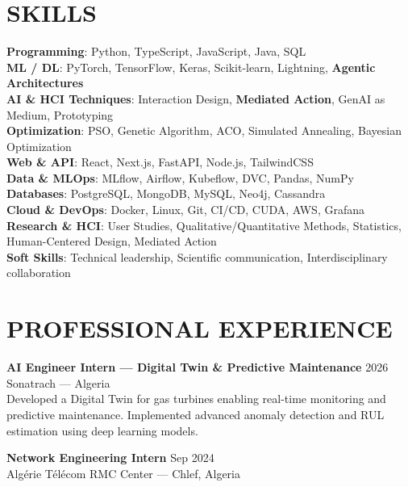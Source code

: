\documentclass[a4paper,12pt]{article}
\begin{document}
\section{SKILLS}
\setlength{\parskip}{-1pt}
{\normalsize
\textbf{Programming}: Python, TypeScript, JavaScript, Java, SQL \\

\textbf{ML / DL}: PyTorch, TensorFlow, Keras, Scikit-learn, Lightning, \textbf{Agentic Architectures} \\

\textbf{AI \& HCI Techniques}: Interaction Design, \textbf{Mediated Action}, GenAI as Medium, Prototyping \\

\textbf{Optimization}: PSO, Genetic Algorithm, ACO, Simulated Annealing, Bayesian Optimization \\

\textbf{Web \& API}: React, Next.js, FastAPI, Node.js, TailwindCSS \\

\textbf{Data \& MLOps}: MLflow, Airflow, Kubeflow, DVC, Pandas, NumPy \\

\textbf{Databases}: PostgreSQL, MongoDB, MySQL, Neo4j, Cassandra \\

\textbf{Cloud \& DevOps}: Docker, Linux, Git, CI/CD, CUDA, AWS, Grafana \\

\textbf{Research \& HCI}: User Studies, Qualitative/Quantitative Methods, Statistics, Human-Centered Design, Mediated Action \\

\textbf{Soft Skills}: Technical leadership, Scientific communication, Interdisciplinary collaboration
}

\section{PROFESSIONAL EXPERIENCE}
\textbf{AI Engineer Intern — Digital Twin \& Predictive Maintenance} \hfill 2026 \\
Sonatrach — Algeria \\
Developed a Digital Twin for gas turbines enabling real-time monitoring and predictive maintenance. Implemented advanced anomaly detection and RUL estimation using deep learning models.

\textbf{Network Engineering Intern} \hfill Sep 2024 \\
Algérie Télécom RMC Center — Chlef, Algeria
\end{document}
